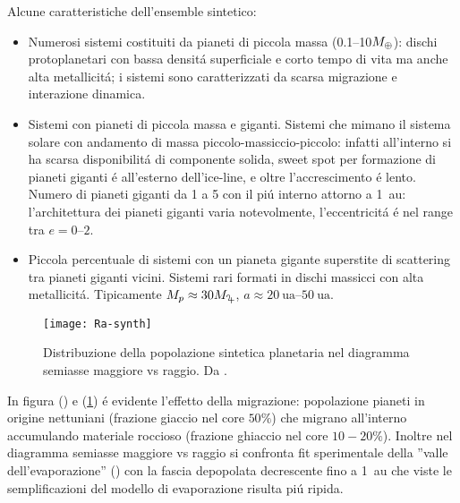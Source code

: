 Alcune caratteristiche dell'ensemble sintetico: %
\begin{itemize}
\item Numerosi sistemi costituiti da pianeti di piccola massa (\numrange{0.1}{10}$M_{\oplus}{}$): dischi protoplanetari con bassa densit\'a superficiale e corto tempo di vita ma anche alta metallicit\'a; i sistemi sono caratterizzati da scarsa migrazione e interazione dinamica.
\item Sistemi con pianeti di piccola massa e giganti. Sistemi che mimano il sistema solare con andamento di massa piccolo-massiccio-piccolo: infatti all'interno si ha scarsa disponibilit\'a di componente solida, sweet spot per formazione di pianeti giganti \'e all'esterno dell'ice-line, e oltre l'accrescimento \'e lento. Numero di pianeti giganti da 1 a 5 con il pi\'u interno attorno a \SI{1}{\astronomicalunit}: l'architettura dei pianeti giganti varia notevolmente, l'eccentricit\'a \'e nel range tra $e=\numrange{0}{2}$.
\item Piccola percentuale di sistemi con un pianeta gigante superstite di scattering tra pianeti giganti vicini. Sistemi rari formati in dischi massicci con alta metallicit\'a. Tipicamente $M_p\approx30\mjupiter{}$, $a\approx\SIrange{20}{50}{\astronomicalunit}$.
\end{itemize}

\begin{figure}[!ht]
	\texttt{[image: Ra-synth]}
	\caption{Distribuzione della popolazione sintetica planetaria nel diagramma semiasse maggiore vs raggio. Da \cite{mordasini2018planetary}.}\label{fig:Ra-synth}
\end{figure}

In figura () e (\ref{fig:Ra-synth}) \'e evidente l'effetto della migrazione: popolazione pianeti in origine nettuniani (frazione giaccio nel core $50\%$) che migrano all'interno accumulando materiale roccioso (frazione ghiaccio nel core $10-20\%$). Inoltre nel diagramma semiasse maggiore vs raggio si confronta fit sperimentale della ''valle dell'evaporazione'' (\cite{van2018asteroseismic}) con la fascia depopolata decrescente fino a \SI{1}{\astronomicalunit} che viste le semplificazioni del modello di evaporazione risulta pi\'u ripida.


